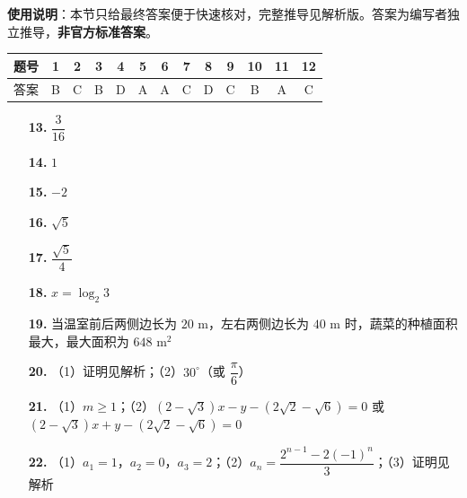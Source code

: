 
\begin{gknotice}
\textbf{使用说明}：本节只给最终答案便于快速核对，完整推导见解析版。答案为编写者独立推导，\textbf{非官方标准答案}。
\end{gknotice}

\begin{center}\begin{tabular}{ccccccccccccc}
\toprule
题号 & 1 & 2 & 3 & 4 & 5 & 6 & 7 & 8 & 9 & 10 & 11 & 12 \\
\midrule
答案 & B & C & B & D & A & A & C & D & C & B & A & C \\
\bottomrule
\end{tabular}\end{center}

\begin{itemize}[leftmargin=2.6em]
  \item[\textbf{13.}] $\dfrac{3}{16}$
  \item[\textbf{14.}] $1$
  \item[\textbf{15.}] $-2$
  \item[\textbf{16.}] $\sqrt{5}$
\end{itemize}

\begin{itemize}[leftmargin=2.6em]
  \item[\textbf{17.}] $\dfrac{\sqrt{5}}{4}$
  \item[\textbf{18.}] $x=\log_2 3$
  \item[\textbf{19.}] 当温室前后两侧边长为 $20\text{ m}$，左右两侧边长为 $40\text{ m}$ 时，蔬菜的种植面积最大，最大面积为 $648\text{ m}^2$
  \item[\textbf{20.}] （1）证明见解析；（2）$30^\circ$（或 $\dfrac{\pi}{6}$）
  \item[\textbf{21.}] （1）$m\geqslant 1$；（2）$(2-\sqrt{3})x-y-(2\sqrt{2}-\sqrt{6})=0$ 或 $(2-\sqrt{3})x+y-(2\sqrt{2}-\sqrt{6})=0$
  \item[\textbf{22.}] （1）$a_1=1$，$a_2=0$，$a_3=2$；（2）$a_n=\dfrac{2^{n-1}-2(-1)^n}{3}$；（3）证明见解析
\end{itemize}
